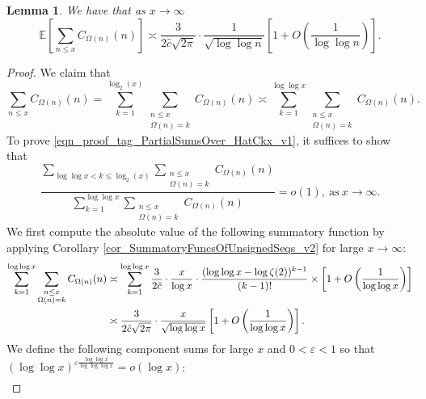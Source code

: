 \documentclass[11pt,reqno,a4letter]{article}
\numberwithin{figure}{section}
\numberwithin{table}{section}
\theoremstyle{plain}
\newtheorem{lemma}[theorem]{Lemma}
\numberwithin{theorem}{section}
\theoremstyle{definition}
\begin{document}
\begin{lemma} 
\label{lemma_HatCAstxSum_ExactFormulaWithError_v1} 
We have that as $x \rightarrow \infty$ 
\[
\mathbb{E}\left[\sum_{n \leq x} C_{\Omega(n)}(n)\right]
     \asymp \frac{3}{2\hat{c} \sqrt{2\pi}} \cdot \frac{1}{\sqrt{\log\log n}}\left[1 + 
     O\left(\frac{1}{\log\log n}\right)\right]. 
\] 
\end{lemma} 
\begin{proof} 
We claim that 
\begin{equation} 
\label{eqn_proof_tag_PartialSumsOver_HatCkx_v1} 
\sum_{n \leq x} C_{\Omega(n)}(n) = 
     \sum_{k=1}^{\log_2(x)} \sum_{\substack{n \leq x \\ \Omega(n) = k}} C_{\Omega(n)}(n) \asymp 
     \sum_{k=1}^{\log\log x} \sum_{\substack{n \leq x \\ \Omega(n) = k}} C_{\Omega(n)}(n). 
\end{equation} 
To prove \eqref{eqn_proof_tag_PartialSumsOver_HatCkx_v1}, it suffices to show that 
\begin{equation} 
\label{eqn_proof_tag_PartialSumsOver_HatCkx_EquivCond_v2} 
\frac{\sum\limits_{\log\log x < k \leq \log_2(x)} \sum\limits_{\substack{n \leq x \\ \Omega(n) = k}} C_{\Omega(n)}(n)}{ 
     \sum\limits_{k=1}^{\log\log x} \sum\limits_{\substack{n \leq x \\ \Omega(n) = k}} C_{\Omega(n)}(n)} = o(1), 
     \mathrm{\ as\ } x \rightarrow \infty. 
\end{equation} 
We first compute the absolute value of the following 
summatory function by applying 
Corollary \ref{cor_SummatoryFuncsOfUnsignedSeqs_v2} for 
large $x \rightarrow \infty$: 
\begin{align} 
\notag 
\sum_{k=1}^{\log\log x} \sum_{\substack{n \leq x \\ \Omega(n) = k}} C_{\Omega(n)}(n) & \asymp 
     \sum_{k=1}^{\log\log x} \frac{3}{2\hat{c}} \cdot \frac{x}{\log x} \cdot 
     \frac{(\log\log x - \log\zeta(2))^{k-1}}{(k-1)!} \times \left[1 + 
     O\left(\frac{1}{\log\log x}\right)\right] \\ 
\label{eqn_proof_tag_PartialSumsOver_HatCkx_v3} 
     & \asymp \frac{3}{2\hat{c} \sqrt{2\pi}} \cdot \frac{x}{\sqrt{\log\log x}}\left[1 + 
     O\left(\frac{1}{\log\log x}\right)\right]. 
\end{align} 
We define the following component sums for large $x$ and $0 < \varepsilon < 1$ so that 
$(\log\log x)^{\varepsilon \frac{\log\log x}{\log\log\log x}} = o(\log x)$: 
\begin{align*} 

\end{align*}
\end{proof}
\end{document}
